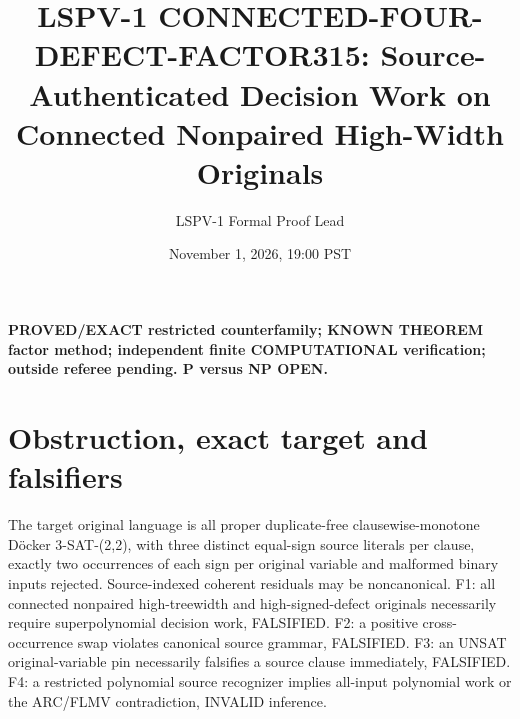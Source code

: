 \documentclass[11pt]{article}
\title{LSPV-1 CONNECTED-FOUR-DEFECT-FACTOR315: Source-Authenticated Decision Work on Connected Nonpaired High-Width Originals}
\author{LSPV-1 Formal Proof Lead}
\date{November 1, 2026, 19:00 PST}
\begin{document}
\maketitle
\noindent\textbf{PROVED/EXACT restricted counterfamily; KNOWN THEOREM factor method; independent finite COMPUTATIONAL verification; outside referee pending. P versus NP OPEN.}
\section{Obstruction, exact target and falsifiers}
The target original language is all proper duplicate-free clausewise-monotone D\"ocker 3-SAT-(2,2), with three distinct equal-sign source literals per clause, exactly two occurrences of each sign per original variable and malformed binary inputs rejected. Source-indexed coherent residuals may be noncanonical. F1: all connected nonpaired high-treewidth and high-signed-defect originals necessarily require superpolynomial decision work, FALSIFIED. F2: a positive cross-occurrence swap violates canonical source grammar, FALSIFIED. F3: an UNSAT original-variable pin necessarily falsifies a source clause immediately, FALSIFIED. F4: a restricted polynomial source recognizer implies all-input polynomial work or the ARC/FLMV contradiction, INVALID inference.
\end{document}
